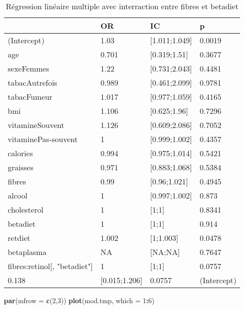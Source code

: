 \documentclass[]{article}
\newenvironment{Shaded}{\begin{snugshade}}{\end{snugshade}}
\newcommand{\KeywordTok}[1]{\textcolor[rgb]{0.13,0.29,0.53}{\textbf{#1}}}
\newcommand{\DataTypeTok}[1]{\textcolor[rgb]{0.13,0.29,0.53}{#1}}
\newcommand{\DecValTok}[1]{\textcolor[rgb]{0.00,0.00,0.81}{#1}}
\newcommand{\OperatorTok}[1]{\textcolor[rgb]{0.81,0.36,0.00}{\textbf{#1}}}
\newcommand{\NormalTok}[1]{#1}
\begin{document}
\begin{table}

\caption{\label{tab:unnamed-chunk-90}Régression linéaire multiple avec interraction entre fibres et betadiet}
\centering
\begin{tabular}[t]{l|l|l|l}
\hline
  & OR & IC & p\\
\hline
\rowcolor[HTML]{BBD2E1}  (Intercept) & 1.03 & [1.011;1.049] & 0.0019\\
\hline
age & 0.701 & [0.319;1.51] & 0.3677\\
\hline
\rowcolor[HTML]{BBD2E1}  sexeFemmes & 1.22 & [0.731;2.043] & 0.4481\\
\hline
tabacAutrefois & 0.989 & [0.461;2.099] & 0.9781\\
\hline
\rowcolor[HTML]{BBD2E1}  tabacFumeur & 1.017 & [0.977;1.059] & 0.4165\\
\hline
bmi & 1.106 & [0.625;1.96] & 0.7296\\
\hline
\rowcolor[HTML]{BBD2E1}  vitamineSouvent & 1.126 & [0.609;2.086] & 0.7052\\
\hline
vitaminePas-souvent & 1 & [0.999;1.002] & 0.4357\\
\hline
\rowcolor[HTML]{BBD2E1}  calories & 0.994 & [0.975;1.014] & 0.5421\\
\hline
graisses & 0.971 & [0.883;1.068] & 0.5384\\
\hline
\rowcolor[HTML]{BBD2E1}  fibres & 0.99 & [0.96;1.021] & 0.4945\\
\hline
alcool & 1 & [0.997;1.002] & 0.873\\
\hline
\rowcolor[HTML]{BBD2E1}  cholesterol & 1 & [1;1] & 0.8341\\
\hline
betadiet & 1 & [1;1] & 0.914\\
\hline
\rowcolor[HTML]{BBD2E1}  retdiet & 1.002 & [1;1.003] & 0.0478\\
\hline
betaplasma & NA & [NA;NA] & 0.7647\\
\hline
\rowcolor[HTML]{BBD2E1}  fibres:retinol[, "betadiet"] & 1 & [1;1] & 0.0757\\
\hline
0.138 & [0.015;1.206] & 0.0757 & (Intercept)\\
\hline
\end{tabular}
\end{table}

\begin{Shaded}
\begin{Highlighting}[]
\KeywordTok{par}\NormalTok{(}\DataTypeTok{mfrow =} \KeywordTok{c}\NormalTok{(}\DecValTok{2}\NormalTok{,}\DecValTok{3}\NormalTok{))}
\KeywordTok{plot}\NormalTok{(mod.tmp, }\DataTypeTok{which =} \DecValTok{1}\OperatorTok{:}\DecValTok{6}\NormalTok{)}
\end{Highlighting}
\end{Shaded}
\end{document}
